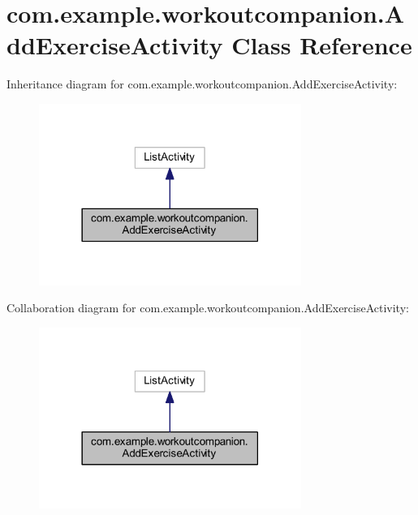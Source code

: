 \hypertarget{classcom_1_1example_1_1workoutcompanion_1_1_add_exercise_activity}{\section{com.\-example.\-workoutcompanion.\-Add\-Exercise\-Activity Class Reference}
\label{classcom_1_1example_1_1workoutcompanion_1_1_add_exercise_activity}
}


Inheritance diagram for com.\-example.\-workoutcompanion.\-Add\-Exercise\-Activity\-:
\nopagebreak
\begin{figure}[H]
\begin{center}
\leavevmode
\includegraphics[width=242pt]{classcom_1_1example_1_1workoutcompanion_1_1_add_exercise_activity__inherit__graph}
\end{center}
\end{figure}


Collaboration diagram for com.\-example.\-workoutcompanion.\-Add\-Exercise\-Activity\-:
\nopagebreak
\begin{figure}[H]
\begin{center}
\leavevmode
\includegraphics[width=242pt]{classcom_1_1example_1_1workoutcompanion_1_1_add_exercise_activity__coll__graph}
\end{center}
\end{figure}
